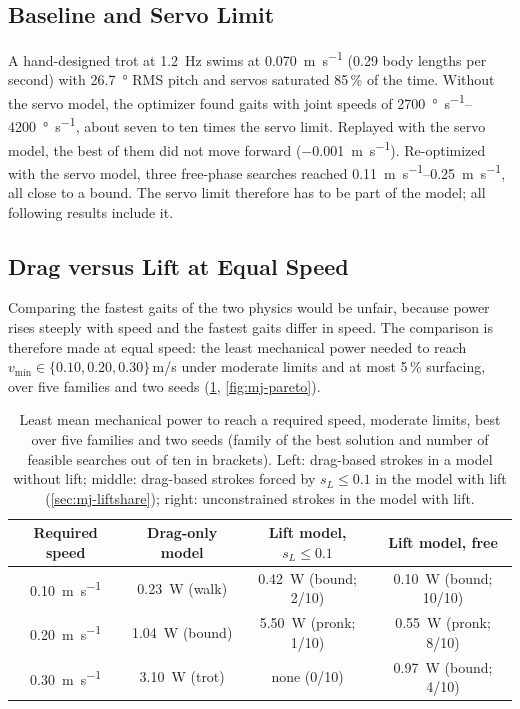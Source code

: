 \subsection{Baseline and Servo Limit}

A hand-designed trot at \SI{1.2}{\hertz} swims at \SI{0.070}{\metre\per\second} (0.29 body lengths per second)
with \SI{26.7}{\degree} RMS pitch and servos saturated 85\,\% of the time. Without the servo model, the
optimizer found gaits with joint speeds of \SIrange{2700}{4200}{\degree\per\second}, about seven to ten times the servo limit. Replayed with the servo model, the best of them did not move forward
(\SI{-0.001}{\metre\per\second}). Re-optimized with the servo model, three free-phase searches reached
\SIrange{0.11}{0.25}{\metre\per\second}, all close to a bound. The servo limit therefore has to be part of the
model; all following results include it.

\subsection{Drag versus Lift at Equal Speed}

Comparing the fastest gaits of the two physics would be unfair, because power rises steeply with speed and the
fastest gaits differ in speed. The comparison is therefore made at equal speed: the least mechanical power
needed to reach $v_\text{min}\in\{0.10,0.20,0.30\}$\,m/s under moderate limits and at most 5\,\% surfacing,
over five families and two seeds (\cref{tab:mj-pareto}, \cref{fig:mj-pareto}).

\begin{table}[t]
  \centering
  \caption[Least power at equal speed, drag versus lift]{Least mean mechanical power to reach a required speed,
    moderate limits, best over five families and two seeds (family of the best solution and number of feasible searches out of
    ten in brackets). Left: drag-based strokes in a model without lift; middle: drag-based strokes forced by $s_L\le0.1$ in the
    model with lift (\cref{sec:mj-liftshare}); right: unconstrained strokes in the model with lift.}
  \label{tab:mj-pareto}
  \small
  \begin{tabular}{@{}cccc@{}}
    \toprule
    Required speed & Drag-only model & Lift model, $s_L\le0.1$ & Lift model, free \\
    \midrule
    \SI{0.10}{\metre\per\second} & \SI{0.23}{\watt} (walk) & \SI{0.42}{\watt} (bound; 2/10) & \SI{0.10}{\watt} (bound; 10/10) \\
    \SI{0.20}{\metre\per\second} & \SI{1.04}{\watt} (bound) & \SI{5.50}{\watt} (pronk; 1/10) & \SI{0.55}{\watt} (pronk; 8/10) \\
    \SI{0.30}{\metre\per\second} & \SI{3.10}{\watt} (trot) & none (0/10) & \SI{0.97}{\watt} (bound; 4/10) \\
    \bottomrule
  \end{tabular}
\end{table}

